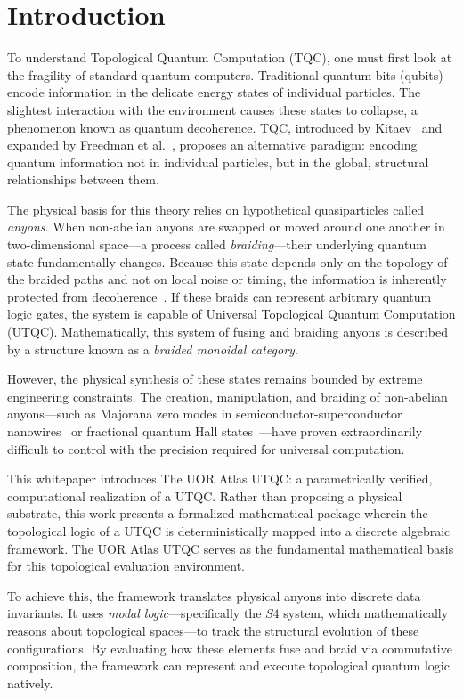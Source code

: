 \section{Introduction}

To understand Topological Quantum Computation (TQC), one must first look at the fragility of standard quantum computers. Traditional quantum bits (qubits) encode information in the delicate energy states of individual particles. The slightest interaction with the environment causes these states to collapse, a phenomenon known as quantum decoherence. TQC, introduced by Kitaev~\cite{kitaev2003} and expanded by Freedman et al.\ \cite{freedman2003}, proposes an alternative paradigm: encoding quantum information not in individual particles, but in the global, structural relationships between them.

The physical basis for this theory relies on hypothetical quasiparticles called \textit{anyons}. When non-abelian anyons are swapped or moved around one another in two-dimensional space—a process called \textit{braiding}—their underlying quantum state fundamentally changes. Because this state depends only on the topology of the braided paths and not on local noise or timing, the information is inherently protected from decoherence~\cite{nayak2008}. If these braids can represent arbitrary quantum logic gates, the system is capable of Universal Topological Quantum Computation (UTQC). Mathematically, this system of fusing and braiding anyons is described by a structure known as a \textit{braided monoidal category}.

However, the physical synthesis of these states remains bounded by extreme engineering constraints. The creation, manipulation, and braiding of non-abelian anyons---such as Majorana zero modes in semiconductor-superconductor nanowires~\cite{alicea2012} or fractional quantum Hall states~\cite{moore1991}---have proven extraordinarily difficult to control with the precision required for universal computation.

This whitepaper introduces The UOR Atlas UTQC\@: a parametrically verified, computational realization of a UTQC\@. Rather than proposing a physical substrate, this work presents a formalized mathematical package wherein the topological logic of a UTQC is deterministically mapped into a discrete algebraic framework. The UOR Atlas UTQC serves as the fundamental mathematical basis for this topological evaluation environment.

To achieve this, the framework translates physical anyons into discrete data invariants. It uses \textit{modal logic}—specifically the $S4$ system, which mathematically reasons about topological spaces—to track the structural evolution of these configurations. By evaluating how these elements fuse and braid via commutative composition, the framework can represent and execute topological quantum logic natively.

